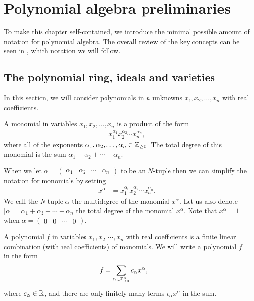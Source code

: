 \section{Polynomial algebra preliminaries}
To make this chapter self-contained, we introduce the minimal possible amount of notation for polynomial algebra.
The overall review of the key concepts can be seen in \cite{Cox-Little-Shea2015}, which notation we will follow.

\subsection{The polynomial ring, ideals and varieties}
In this section, we will consider polynomials in $n$ unknowns $x_1, x_2, \ldots, x_n$ with real coefficients.

\begin{definition}
  A monomial in variables $x_1, x_2, \ldots , x_n$ is a product of the form
  \begin{align}
    x_1^{\alpha_1} x_2^{\alpha_2} \cdots x_n^{\alpha_n},
  \end{align}
  where all of the exponents $\alpha_1, \alpha_2, \ldots, \alpha_n \in \mathbb{Z}_{\geq0}$.
  The total degree of this monomial is the sum $\alpha_1 + \alpha_2 + \cdots + \alpha_n$.
\end{definition}

When we let $\alpha = \begin{pmatrix}\alpha_1 & \alpha_2 & \cdots & \alpha_n\end{pmatrix}$ to be an $N$-tuple then we can simplify the notation for monomials by setting
\begin{align}
  x^\alpha &= x_1^{\alpha_1} x_2^{\alpha_2} \cdots x_n^{\alpha_n}.
\end{align}
We call the $N$-tuple $\alpha$ the multidegree of the monomial $x^\alpha$.
Let us also denote $|\alpha| = \alpha_1 + \alpha_2 + \cdots + \alpha_n$ the total degree of the monomial $x^\alpha$.
Note that $x^\alpha = 1$ when $\alpha = \begin{pmatrix}0 & 0 & \cdots & 0\end{pmatrix}$.

\begin{definition}
  A polynomial $f$ in variables $x_1, x_2, \cdots, x_n$ with real coefficients is a finite linear combination (with real coefficients) of monomials.
  We will write a polynomial $f$ in the form
  \begin{align}
    f &= \sum_{\alpha\in\mathbb{Z}_{\geq0}^n} c_\alpha x^\alpha,
  \end{align}
where $c_\alpha\in\mathbb{R}$, and there are only finitely many terms $c_\alpha x^\alpha$ in the sum.
\end{definition}

